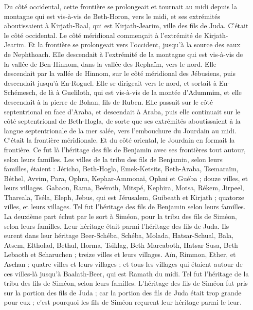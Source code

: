 \begin{multicols}{2}
Du côté occidental, cette frontière se prolongeait et tournait au midi depuis la montagne qui est vis-à-vis de Beth-Horon, vers le midi, et ses extrémités aboutissaient à Kirjath-Baal, qui est Kirjath-Jearim, ville des fils de Juda. C’était le côté occidental.
Le côté méridional commençait à l’extrémité de Kirjath-Jearim. Et la frontière se prolongeait vers l’occident, jusqu’à la source des eaux de Nephthoach.
Elle descendait à l’extrémité de la montagne qui est vis-à-vis de la vallée de Ben-Hinnom, dans la vallée des Rephaïm, vers le nord. Elle descendait par la vallée de Hinnom, sur le côté méridional des Jébusiens, puis descendait jusqu’à En-Roguel.
Elle se dirigeait vers le nord, et sortait à En-Schémesch, de là à Gueliloth, qui est vis-à-vis de la montée d’Adummim, et elle descendait à la pierre de Bohan, fils de Ruben.
Elle passait sur le côté septentrional en face d’Araba, et descendait à Araba,
puis elle continuait sur le côté septentrional de Beth-Hogla, de sorte que ses extrémités aboutissaient à la langue septentrionale de la mer salée, vers l’embouchure du Jourdain au midi. C’était la frontière méridionale.
Et du côté oriental, le Jourdain en formait la frontière. Ce fut là l’héritage des fils de Benjamin avec ses frontières tout autour, selon leurs familles.
Les villes de la tribu des fils de Benjamin, selon leurs familles, étaient : Jéricho, Beth-Hogla, Emek-Ketsits,
Beth-Araba, Tsemaraïm, Béthel,
Avvim, Para, Ophra,
Kephar-Ammonaï, Ophni et Guéba ; douze villes, et leurs villages.
Gabaon, Rama, Beéroth,
Mitspé, Kephira, Motsa,
Rékem, Jirpeel, Thareala,
Tséla, Eleph, Jebus, qui est Jérusalem, Guibeath et Kirjath ; quatorze villes, et leurs villages. Tel fut l’héritage des fils de Benjamin selon leurs familles.
\VerseOne{}La deuxième part échut par le sort à Siméon, pour la tribu des fils de Siméon, selon leurs familles. Leur héritage était parmi l’héritage des fils de Juda.
Ils eurent dans leur héritage Beer-Schéba, Schéba, Molada,
Hatsar-Schual, Bala, Atsem,
Eltholad, Bethul, Horma,
Tsiklag, Beth-Marcaboth, Hatsar-Susa,
Beth-Lebaoth et Scharuchen ; treize villes et leurs villages.
Aïn, Rimmon, Ether, et Aschan ; quatre villes et leurs villages ;
et tous les villages qui étaient autour de ces villes-là jusqu’à Baalath-Beer, qui est Ramath du midi. Tel fut l’héritage de la tribu des fils de Siméon, selon leurs familles.
L’héritage des fils de Siméon fut pris sur la portion des fils de Juda ; car la portion des fils de Juda était trop grande pour eux ; c’est pourquoi les fils de Siméon reçurent leur héritage parmi le leur.

\end{multicols}
